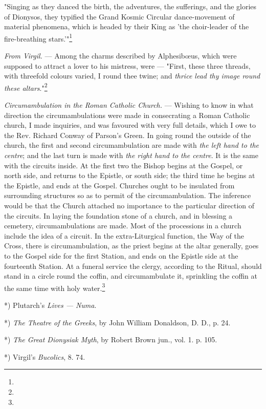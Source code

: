 \documentclass[a4paper, 11pt, oneside, polutonikogreek, english]{article}
\begin{document}
"Singing as they danced the birth, the adventures, the sufferings, and the glories of Dionysos, they typified the Grand Kosmic Circular dance-movement of material phenomena, which is headed by their King as 'the choir-leader of the fire-breathing stars.'"\footnote{}

\emph{From Virgil.} --- Among the charms described by Alphesibœus, which were supposed to attract a lover to his mistress, were --- "First, these three threads, with threefold colours varied, I round thee twine; and \emph{thrice lead thy image round these altars}."\footnote{}

\emph{Circumambulation in the Roman Catholic Church.} --- Wishing to know in what direction the circumambulations were made in consecrating a Roman Catholic church, I made inquiries, and was favoured with very full details, which I owe to the Rev. Richard Conway of Parson's Green. In going round the outside of the church, the first and second circumambulation are made with \emph{the left hand to the centre}; and the last turn is made with \emph{the right hand to the centre}. It is the same with the circuits inside. At the first two the Bishop begins at the Gospel, or north side, and returns to the Epistle, or south side; the third time he begins at the Epistle, and ends at the Gospel. Churches ought to be insulated from surrounding structures so as to permit of the circumambulation. The inference would be that the Church attached no importance to the particular direction of the circuits. In laying the foundation stone of a church, and in blessing a cemetery, circumambulations are made. Most of the processions in a church include the idea of a circuit. In the extra-Liturgical function, the Way of the Cross, there is circumambulation, as the priest begins at the altar generally, goes to the Gospel side for the first Station, and ends on the Epistle side at the fourteenth Station. At a funeral service the clergy, according to the Ritual, should stand in a circle round the coffin, and circumambulate it, sprinkling the coffin at the same time with holy water.\footnote{}

*) Plutarch's \emph{Lives --- Numa}.

*) \emph{The Theatre of the Greeks}, by John William Donaldson, D. D., p. 24.

*) \emph{The Great Dionysiak Myth}, by Robert Brown jun., vol. 1. p. 105.

*) Virgil's \emph{Bucolics}, 8. 74.
\end{document}
